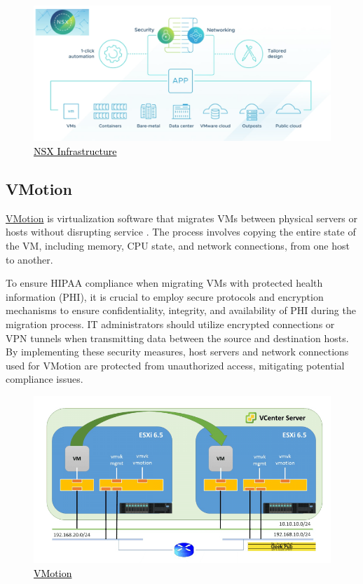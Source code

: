 \begin{figure}[H]
    \centering
    \includegraphics[scale = .19]{images/nsx-diagram.png}
    \caption{\href{https://www.linkedin.com/pulse/vmware-nsxdatacenter-full-stack-solution-part-1-ahmad-karim/}{\textcolor{black}{NSX Infrastructure}}}
    \label{NSX}
\end{figure}

\subsection{VMotion}
\href{https://www.vmware.com/products/vsphere/vmotion.html#:~:text=vMotion%20allows%20you%20to%3A,a%20virtual%20machine%20in%20seconds}{VMotion} is virtualization software that migrates VMs between physical servers or hosts without disrupting service \cite{Murray1}. The process involves copying the entire state of the VM, including memory, CPU state, and network connections, from one host to another. 

To ensure HIPAA compliance when migrating VMs with protected health information (PHI), it is crucial to employ secure protocols and encryption mechanisms to ensure confidentiality, integrity, and availability of PHI during the migration process. IT administrators should utilize encrypted connections or VPN tunnels when transmitting data between the source and destination hosts. By implementing these security measures, host servers and network connections used for VMotion are protected from unauthorized access, mitigating potential compliance issues. 

\begin{figure}[H]
    \centering
    \includegraphics[scale = .50]{images/vmotion.png}
    \caption{\href{https://www.thegeekpub.com/8407/how-vmotion-works/}{\textcolor{black}{VMotion}}}
    \label{VMotion}
\end{figure}